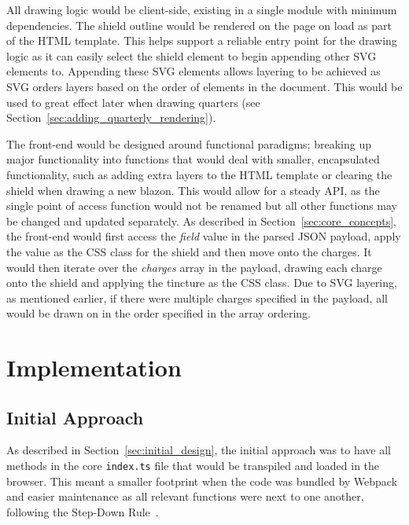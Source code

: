 \documentclass[nobib, a4paper, twoside, justified]{tufte-book}
\begin{document}
All drawing logic would be client-side, existing in a single module with minimum dependencies. The
shield outline would be rendered on the page on load as part of the HTML template. This helps
support a reliable entry point for the drawing logic as it can easily select the shield element to
begin appending other SVG elements to. Appending these SVG elements allows layering to be achieved
as SVG orders layers based on the order of elements in the document. This would be used to great
effect later when drawing quarters (see Section~\ref{sec:adding_quarterly_rendering}).

The front-end would be designed around functional paradigms; breaking up major functionality into
functions that would deal with smaller, encapsulated functionality, such as adding extra layers to
the HTML template or clearing the shield when drawing a new blazon. This would allow for a steady
API, as the single point of access function would not be renamed but all other functions may be
changed and updated separately. As described in Section~\ref{sec:core_concepts}, the front-end
would first access the \textit{field} value in the parsed JSON payload, apply the value as the CSS
class for the shield and then move onto the charges. It would then iterate over the
\textit{charges} array in the payload, drawing each charge onto the shield and applying the
tincture as the CSS class. Due to SVG layering, as mentioned earlier, if there were multiple
charges specified in the payload, all would be drawn on in the order specified in the array
ordering.

\chapter{Implementation}%
\label{cha:implementation}

\section{Initial Approach}%
\label{sec:initial_approach}

As described in Section~\ref{sec:initial_design}, the initial approach was to have all methods in
the core \texttt{index.ts} file that would be transpiled and loaded in the browser. This meant a
smaller footprint when the code was bundled by Webpack and easier maintenance as all relevant
functions were next to one another, following the Step-Down Rule~\autocite{martin2009clean}.
\end{document}
